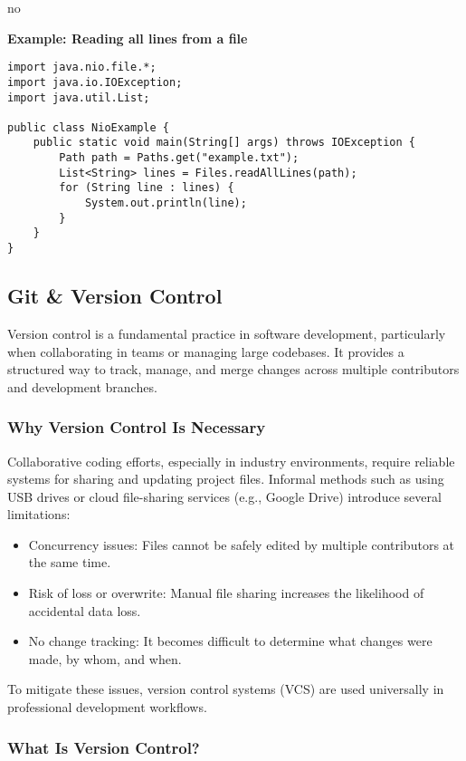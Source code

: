 no\documentclass{article}
\begin{document}
\noindent\textbf{Example: Reading all lines from a file}
\begin{verbatim}
import java.nio.file.*;
import java.io.IOException;
import java.util.List;

public class NioExample {
    public static void main(String[] args) throws IOException {
        Path path = Paths.get("example.txt");
        List<String> lines = Files.readAllLines(path);
        for (String line : lines) {
            System.out.println(line);
        }
    }
}
\end{verbatim}

\subsection{Git \& Version Control}

Version control is a fundamental practice in software development, particularly when collaborating in teams or managing large codebases. It provides a structured way to track, manage, and merge changes across multiple contributors and development branches.

\subsubsection{Why Version Control Is Necessary}

Collaborative coding efforts, especially in industry environments, require reliable systems for sharing and updating project files. Informal methods such as using USB drives or cloud file-sharing services (e.g., Google Drive) introduce several limitations:

\begin{itemize}
    \item Concurrency issues: Files cannot be safely edited by multiple contributors at the same time.
    \item Risk of loss or overwrite: Manual file sharing increases the likelihood of accidental data loss.
    \item No change tracking: It becomes difficult to determine what changes were made, by whom, and when.
\end{itemize}

To mitigate these issues, version control systems (VCS) are used universally in professional development workflows.

\subsubsection{What Is Version Control?}
\end{document}

